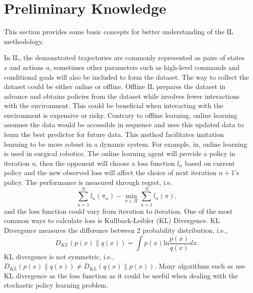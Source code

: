 \documentclass[acmsmall]{acmart}
\begin{document}
\section{Preliminary Knowledge}\label{pre}
This section provides some basic concepts for better understanding of the IL methodology.

In IL, the demonstrated trajectories are commonly represented as pairs of states $s$ and actions $a$, sometimes other parameters such as high-level commands and conditional goals will also be included to form the dataset. The way to collect the dataset could be either online or offline. Offline IL prepares the dataset in advance and obtains policies from the dataset while involves fewer interactions with the environment. This could be beneficial when interacting with the environment is expensive or risky. Contrary to offline learning, online learning assumes the data would be accessible in sequence and uses this updated data to learn the best predictor for future data. This method facilitates imitation learning to be more robust in a dynamic system. For example, in\cite{rossReductionImitationLearning2011,osaOnlineTrajectoryPlanning2014,osaOnlineTrajectoryPlanning2018}, online learning is used in surgical robotics. The online learning agent will provide a policy in iteration \textit{n}, then the opponent will choose a loss function \textit{$l_n$} based on current policy and the new observed loss will affect the choice of next iteration \textit{$n+1$}'s policy. The performance is measured through regret, i.e.
\[
\sum_{n=1}^{N}l_n(\pi_n)-\min_{\pi\in\Pi}\sum_{n=1}^{N}l_n(\pi),
\]
and the loss function could vary from iteration to iteration. One of the most common ways to calculate loss is Kullback-Leibler (KL) Divergence. KL Divergence measures the difference between 2 probability distribution, i.e.,
\[
D_{KL}(p(x)\parallel q(x)) = \int p(x)\text{ln}\frac{p(x)}{q(x)}dx.
\]
KL divergence is not symmetric, i.e., $D_{KL}(p(x)\parallel q(x)) \neq D_{KL}(q(x)\parallel p(x))$. Many algorithms such as\cite{schulmanTrustRegionPolicy2017,bhattacharyyaMultiAgentImitationLearning2018} use KL divergence as the loss function as it could be useful when dealing with the stochastic policy learning problem.
\end{document}
